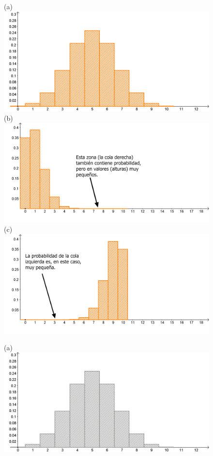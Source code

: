   \begin{figure}[p]
	\begin{center}
	\begin{enColor}
    (a)\\
	\includegraphics[width=11.5cm]{../fig/Cap05-ZooBinomial01.png}\\[3mm]
    (b)\\
    \includegraphics[width=11.5cm]{../fig/Cap05-ZooBinomial02.png}\\[3mm]
    (c)\\
    \includegraphics[width=11.5cm]{../fig/Cap05-ZooBinomial03.png}\\
	\end{enColor}
	\begin{bn}
    (a)\\
	\includegraphics[width=11.5cm]{../fig/Cap05-ZooBinomial01-bn.png}\\[3mm]

\end{bn}
\end{center}
\end{figure}
